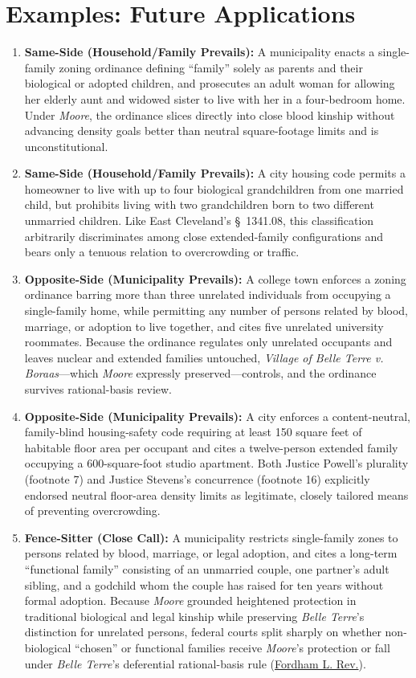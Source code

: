 \documentclass[12pt]{article}
\begin{document}
\section{Examples: Future Applications}
\begin{enumerate}
\item \textbf{Same-Side (Household/Family Prevails):} A municipality enacts a single-family zoning ordinance defining ``family'' solely as parents and their biological or adopted children, and prosecutes an adult woman for allowing her elderly aunt and widowed sister to live with her in a four-bedroom home. Under \textit{Moore}, the ordinance slices directly into close blood kinship without advancing density goals better than neutral square-footage limits and is unconstitutional.
\item \textbf{Same-Side (Household/Family Prevails):} A city housing code permits a homeowner to live with up to four biological grandchildren from one married child, but prohibits living with two grandchildren born to two different unmarried children. Like East Cleveland's \S~1341.08, this classification arbitrarily discriminates among close extended-family configurations and bears only a tenuous relation to overcrowding or traffic.
\item \textbf{Opposite-Side (Municipality Prevails):} A college town enforces a zoning ordinance barring more than three unrelated individuals from occupying a single-family home, while permitting any number of persons related by blood, marriage, or adoption to live together, and cites five unrelated university roommates. Because the ordinance regulates only unrelated occupants and leaves nuclear and extended families untouched, \textit{Village of Belle Terre v. Boraas}---which \textit{Moore} expressly preserved---controls, and the ordinance survives rational-basis review.
\item \textbf{Opposite-Side (Municipality Prevails):} A city enforces a content-neutral, family-blind housing-safety code requiring at least 150 square feet of habitable floor area per occupant and cites a twelve-person extended family occupying a 600-square-foot studio apartment. Both Justice Powell's plurality (footnote 7) and Justice Stevens's concurrence (footnote 16) explicitly endorsed neutral floor-area density limits as legitimate, closely tailored means of preventing overcrowding.
\item \textbf{Fence-Sitter (Close Call):} A municipality restricts single-family zones to persons related by blood, marriage, or legal adoption, and cites a long-term ``functional family'' consisting of an unmarried couple, one partner's adult sibling, and a godchild whom the couple has raised for ten years without formal adoption. Because \textit{Moore} grounded heightened protection in traditional biological and legal kinship while preserving \textit{Belle Terre}'s distinction for unrelated persons, federal courts split sharply on whether non-biological ``chosen'' or functional families receive \textit{Moore}'s protection or fall under \textit{Belle Terre}'s deferential rational-basis rule (\href{https://fordhamlawreview.org/wp-content/uploads/2017/04/Carbone-Cahn_May.pdf}{Fordham L. Rev.}).
\end{enumerate}
\end{document}
